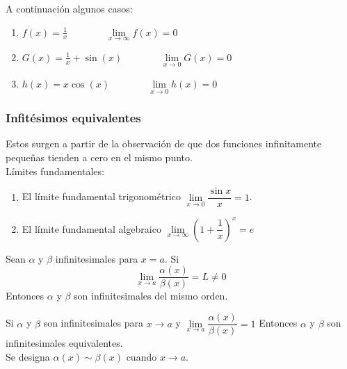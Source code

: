 \documentclass[10pt,twoside]{SelfArx} %
\begin{document}
\begin{ejemplo}
	A continuación algunos casos:\\
\begin{enumerate}
	\item $ f(x)=\frac{1}{x} \;\;\;\;\;\;\;\;\;\;\;\;\;\;	 \lim\limits_{x\rightarrow\infty}f(x)=0 $
	\item $	G(x)=\frac{1}{x}+\sin(x) \;\;\;\;\;\;\;\;\;\;\;\;\;\;	 \lim\limits_{x\rightarrow 0}G(x)=0 $
	\item $	h(x)=x\cos(x)	\;\;\;\;\;\;\;\;\;\;\;\;\;\;	\lim\limits_{x\rightarrow 0}h(x)=0 $
	
\end{enumerate}
%
\end{ejemplo}
\subsubsection{Infitésimos equivalentes}

Estos surgen a partir de la observaci\'on de que dos funciones infinitamente pequeñas tienden a cero en el mismo punto. 
\\

Límites fundamentales:
\begin{enumerate}
	\item El límite fundamental trigonom\'etrico $ \lim\limits_{x\rightarrow0}\dfrac{\sin x}{x}=1 $.
	
	\item El límite fundamental algebraico $ \lim\limits_{x\rightarrow\infty}\left (1+\dfrac{1}{x}\right )^{x}=e $
\end{enumerate}

\begin{thm}
	Sean $ \alpha $ y $ \beta $ infinitesimales para $ x=a $. Si
	\[ \lim\limits_{x\rightarrow a}\dfrac{\alpha(x)}{\beta(x)}=L\neq0 \]
	Entonces $ \alpha $ y $ \beta $  son infinitesimales del mismo orden.
	
\end{thm}

\begin{thm}
	Si $ \alpha $ y $ \beta $ son infinitesimales para $ x\rightarrow a $ y $ \lim\limits_{x\rightarrow a}\dfrac{\alpha(x)}{\beta(x)}=1 $
	Entonces $ \alpha $ y $ \beta $  son infinitesimales equivalentes.\\
	Se designa $  \alpha(x)\sim\beta(x) $  cuando $ x\rightarrow a $.
	
\end{thm}
\end{document}
